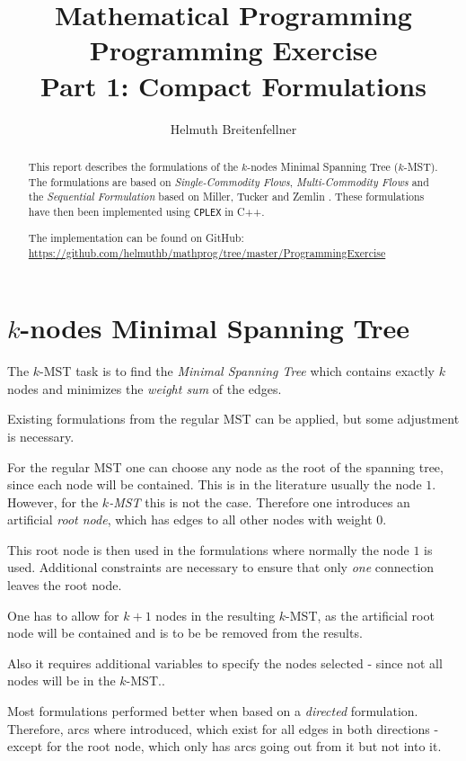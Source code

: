 \documentclass[11pt, oneside, a4paper, fleqn]{article}
\author{Helmuth Breitenfellner}
\title{Mathematical Programming\\
       Programming Exercise\\
       Part 1: Compact Formulations}
\date{}
\begin{document}
\maketitle
\begin{abstract}
This report describes the formulations of the $k$-nodes
Minimal Spanning Tree ($k$-MST).
The formulations are based on \textit{Single-Commodity Flows},
\textit{Multi-Commodity Flows} and the \textit{Sequential Formulation}
based on Miller, Tucker and Zemlin \cite{mtz1960}.
These formulations have then been implemented using \texttt{CPLEX}
in C++.

The implementation can be found on GitHub:\\
\url{https://github.com/helmuthb/mathprog/tree/master/ProgrammingExercise}

\end{abstract}
\section*{$k$-nodes Minimal Spanning Tree}

The $k$-MST task is to find the \emph{Minimal Spanning Tree} which
contains exactly $k$ nodes and minimizes the \emph{weight sum}
of the edges.

Existing formulations from the regular MST can be applied, but
some adjustment is necessary.

For the regular MST one can choose any node as the root of
the spanning tree, since each node will be contained.
This is in the literature usually the node $1$.
However, for the \emph{$k$-MST} this is not the case.
Therefore one introduces an artificial \emph{root node},
which has edges to all other nodes with weight $0$.

This root node is then used in the formulations where normally the
node $1$ is used.
Additional constraints are necessary to ensure that only
\emph{one} connection leaves the root node.

One has to allow for $k+1$ nodes in the resulting $k$-MST, as the
artificial root node will be contained and is to be
be removed from the results.

Also it requires additional variables to specify the nodes
selected - since not all nodes will be in the $k$-MST..

Most formulations performed better when based on a \emph{directed}
formulation.
Therefore, arcs where introduced, which exist for all edges in
both directions - except for the root node, which only has arcs
going out from it but not into it.
\end{document}
